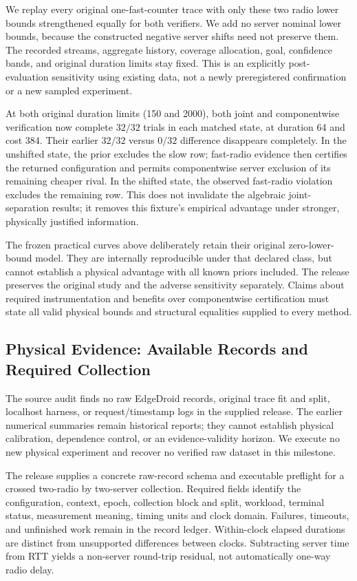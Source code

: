 We replay every original one-fast-counter trace with only these two radio
lower bounds strengthened equally for both verifiers. We add no server
nominal lower bounds, because the constructed negative server shifts need
not preserve them. The recorded streams, aggregate history, coverage
allocation, goal, confidence bands, and original duration limits stay fixed.
This is an explicitly post-evaluation sensitivity using existing data,
not a newly preregistered confirmation or a new sampled experiment.

At both original duration limits (150 and 2000), both joint and componentwise
verification now complete $32/32$ trials in each matched state, at duration
64 and cost 384. Their earlier $32/32$ versus $0/32$ difference disappears
completely. In the unshifted state, the prior excludes the slow row;
fast-radio evidence then certifies the returned configuration and permits
componentwise server exclusion of its remaining cheaper rival. In the
shifted state, the observed fast-radio violation excludes the remaining
row. This does not invalidate the algebraic joint-separation
results; it removes this fixture's empirical advantage under stronger,
physically justified information.

The frozen practical curves above deliberately retain their original
zero-lower-bound model. They are internally reproducible under that declared
class, but cannot establish a physical advantage with all known priors
included. The release preserves the original study and the adverse
sensitivity separately. Claims about required instrumentation and benefits
over componentwise certification must state all valid physical bounds and
structural equalities supplied to every method.

\subsection{Physical Evidence: Available Records and Required Collection}

The source audit finds no raw EdgeDroid records, original trace fit and
split, localhost harness, or request/timestamp logs in the supplied release.
The earlier numerical summaries remain historical reports; they cannot
establish physical calibration, dependence control, or an evidence-validity
horizon. We execute no new physical experiment and recover no verified raw
dataset in this milestone.

The release supplies a concrete raw-record schema and executable preflight
for a crossed two-radio by two-server collection. Required fields identify
the configuration, context, epoch, collection block and split, workload,
terminal status, measurement meaning, timing units and clock domain.
Failures, timeouts, and unfinished work remain in the record ledger.
Within-clock elapsed durations are distinct from unsupported differences
between clocks. Subtracting server time from RTT yields a non-server
round-trip residual, not automatically one-way radio delay.


